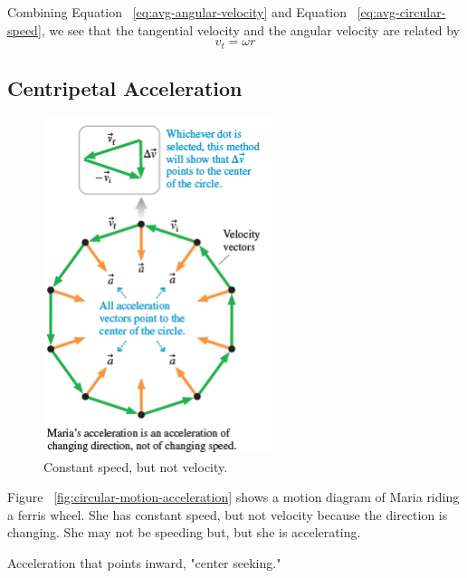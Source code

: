 Combining Equation~%
\ref{eq:avg-angular-velocity} and Equation~%
\ref{eq:avg-circular-speed}, we see that the tangential velocity and the
angular velocity are related by
\begin{equation}
    \label{eq:tangential-angular-velocity-relationship} v_t=\omega r
\end{equation}

\subsection{Centripetal Acceleration}

\begin{figure}
    \centering
    \includegraphics[width=0.6\textwidth]{../figures/centripetal-acceleration.png}
    \caption{Constant speed, but not velocity.}%
    \label{fig:celtripetal-acceleration}
\end{figure}

Figure~%
\ref{fig:circular-motion-acceleration} shows a motion diagram of Maria
riding a ferris wheel.  She has constant speed, but not velocity because
the direction is changing.  She may not be speeding but, but she is
accelerating.

\begin{definition}
    Acceleration that points inward, "center seeking."
\end{definition}

